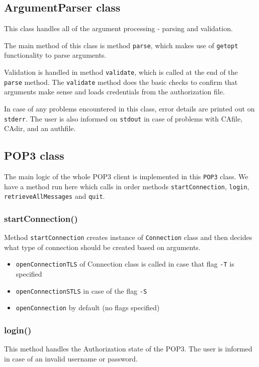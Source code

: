 \documentclass{article}
\begin{document}
\subsection{ArgumentParser class}
\par
This class handles all of the argument processing - parsing and validation.
\par
The main method of this class is method \verb|parse|, which makes use of \verb|getopt| functionality to parse arguments. 
\par
Validation is handled in method \verb|validate|, which is called at the end of the \verb|parse| method. The \verb|validate| method does the basic checks to confirm that arguments make sense and loads credentials from the authorization file. 
\par
In case of any problems encountered in this class, error details are printed out on \verb|stderr|. The user is also informed on \verb|stdout| in case of problems with CAfile, CAdir, and an authfile.


\subsection{POP3 class}
\par
The main logic of the whole POP3 client is implemented in this \verb|POP3| class. We have a method run here which calls in order methods \verb|startConnection|, \verb|login|, \verb|retrieveAllMessages| and \verb|quit|.

\subsubsection{startConnection()}
\par
Method \verb|startConnection| creates instance of \verb|Connection| class and then decides what type of connection should be created based on arguments.
\begin{itemize}
    \item \verb|openConnectionTLS| of Connection class is called in case that flag \verb|-T| is specified
    \item \verb|openConnectionSTLS| in case of the flag \verb|-S|
    \item \verb|openConnection| by default (no flags specified)
\end{itemize}

\subsubsection{login()}
\par
This method handles the Authorization state of the POP3. The user is informed in case of an invalid username or password.
\end{document}
